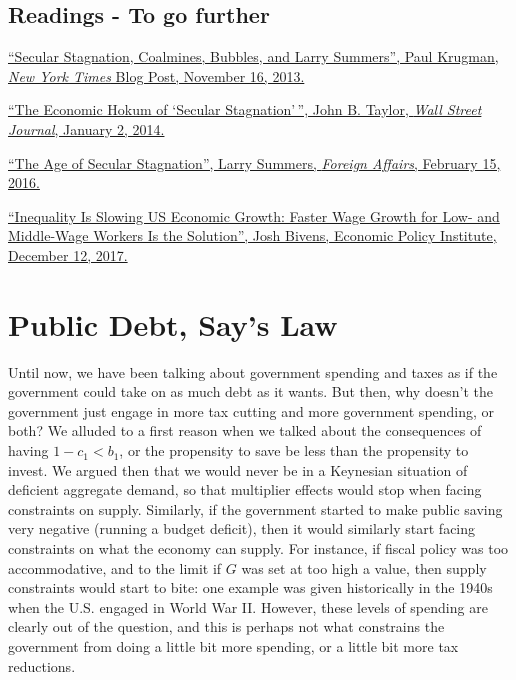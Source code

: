 \documentclass[]{book}
\theoremstyle{definition}
\theoremstyle{definition}
\theoremstyle{definition}
\theoremstyle{remark}
\begin{document}
\section*{Readings - To go further}\label{readings---to-go-further-8}

\href{https://krugman.blogs.nytimes.com/2013/11/16/secular-stagnation-coalmines-bubbles-and-larry-summers/}{``Secular
Stagnation, Coalmines, Bubbles, and Larry Summers'', Paul Krugman,
\emph{New York Times} Blog Post, November 16, 2013.}

\href{https://search.proquest.com/docview/1473347330/6C9B371C00BE4C7BPQ/1?accountid=14512}{``The
Economic Hokum of `Secular Stagnation'\,'', John B. Taylor, \emph{Wall
Street Journal}, January 2, 2014.}

\href{http://larrysummers.com/2016/02/17/the-age-of-secular-stagnation/}{``The
Age of Secular Stagnation'', Larry Summers, \emph{Foreign Affairs},
February 15, 2016.}

\href{https://www.epi.org/publication/secular-stagnation/}{``Inequality
Is Slowing US Economic Growth: Faster Wage Growth for Low- and
Middle-Wage Workers Is the Solution'', Josh Bivens, Economic Policy
Institute, December 12, 2017.}

\hypertarget{public-debt}{\chapter{Public Debt, Say's
Law}\label{public-debt}}

Until now, we have been talking about government spending and taxes as
if the government could take on as much debt as it wants. But then, why
doesn't the government just engage in more tax cutting and more
government spending, or both? We alluded to a first reason when we
talked about the consequences of having \(1-c_1<b_1\), or the propensity
to save be less than the propensity to invest. We argued then that we
would never be in a Keynesian situation of deficient aggregate demand,
so that multiplier effects would stop when facing constraints on supply.
Similarly, if the government started to make public saving very negative
(running a budget deficit), then it would similarly start facing
constraints on what the economy can supply. For instance, if fiscal
policy was too accommodative, and to the limit if \(G\) was set at too
high a value, then supply constraints would start to bite: one example
was given historically in the 1940s when the U.S. engaged in World War
II. However, these levels of spending are clearly out of the question,
and this is perhaps not what constrains the government from doing a
little bit more spending, or a little bit more tax reductions.
\end{document}
